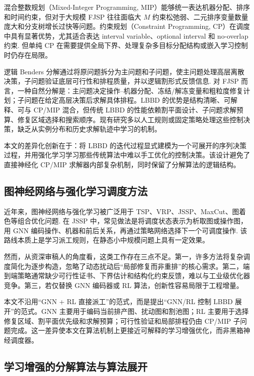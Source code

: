 \documentclass[UTF8,12pt,a4paper]{ctexart}
\begin{document}
混合整数规划（Mixed-Integer Programming, MIP）能够统一表达机器分配、排序和时间约束，但对于大规模 FJSP 往往面临大 $M$ 约束松弛弱、二元排序变量数量庞大和分支树增长过快等问题。约束规划（Constraint Programming, CP）在调度中具有显著优势，尤其适合表达 interval variable、optional interval 和 no-overlap 约束\cite{ref_cp_optimizer,ref_ortools}. 但单纯 CP 在需要提供全局下界、处理复杂多目标分配结构或嵌入学习控制时仍存在局限。

逻辑 Benders 分解通过将原问题拆分为主问题和子问题，使主问题处理高层离散决策，子问题验证底层可行性和排程质量，并以逻辑割形式反馈信息\cite{ref_lbbd}. 对 FJSP 而言，一种自然分解是：主问题决定操作--机器分配、冻结/解冻变量和粗粒度修复计划；子问题在给定高层决策后求解具体排程。LBBD 的优势是结构清晰、可解释、可与 CP/MIP 混合，但传统 LBBD 的性能依赖割平面设计、子问题求解预算、修复区域选择和搜索顺序。现有研究多以人工规则或固定策略处理这些控制决策，缺乏从实例分布和历史求解轨迹中学习的机制。

本文的差异化创新在于：将 LBBD 的迭代过程显式建模为一个可展开的序列决策过程，并用强化学习学习那些传统算法中难以手工优化的控制决策。该设计避免了直接神经化 CP/MIP 求解器内部复杂机制，同时保留了分解算法的逻辑结构。

\subsection{图神经网络与强化学习调度方法}

近年来，图神经网络与强化学习被广泛用于 TSP、VRP、JSSP、MaxCut、图着色等组合优化问题\cite{ref_neural_co,ref_s2v_dqn,ref_attention_model}. 在 JSSP 中，常见做法是将调度状态表示为析取图或操作图，用 GNN 编码操作、机器和前后关系，再通过策略网络选择下一个可调度操作\cite{ref_gnn_rl_jssp}. 该路线本质上是学习派工规则，在静态小中规模问题上具有一定效果。

然而，从资深审稿人的角度看，这类工作存在三点不足。第一，许多方法将复杂调度简化为逐步构造，忽略了动态扰动后“局部修复而非重排”的核心需求。第二，端到端策略通常缺少可行性证书、下界估计和结构化约束反馈，难以与工业级优化器竞争。第三，若仅替换 GNN 编码器或 RL 算法，创新性容易局限于工程增量。

本文不沿用“GNN + RL 直接派工”的范式，而是提出“GNN/RL 控制 LBBD 展开”的范式。GNN 主要用于编码当前排产图、扰动图和割池图；RL 主要用于选择修复区域、割平面优先级和求解预算；可行性验证和局部排程仍由 CP/MIP 子问题完成。这一差异使本文在算法机制上更接近可解释的学习增强优化，而非黑箱神经调度器。

\subsection{学习增强的分解算法与算法展开}
\end{document}
